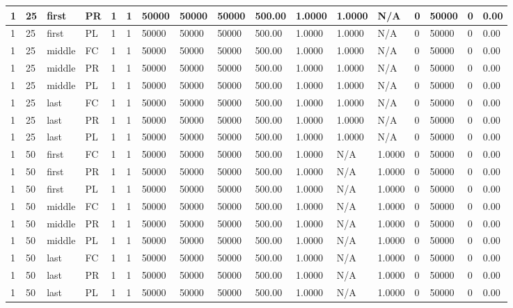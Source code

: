 \begin{tabular}{|l|l|l|l|l|l|l|l|l|l|l|l|l|l|l|l|l|}
1 & 25 & first & PR & 1 & 1 & 50000 & 50000 & 50000 & 500.00 & 1.0000 & 1.0000 & N/A & 0 & 50000 & 0 & 0.00 \\ \hline
1 & 25 & first & PL & 1 & 1 & 50000 & 50000 & 50000 & 500.00 & 1.0000 & 1.0000 & N/A & 0 & 50000 & 0 & 0.00 \\ \hline
1 & 25 & middle & FC & 1 & 1 & 50000 & 50000 & 50000 & 500.00 & 1.0000 & 1.0000 & N/A & 0 & 50000 & 0 & 0.00 \\ \hline
1 & 25 & middle & PR & 1 & 1 & 50000 & 50000 & 50000 & 500.00 & 1.0000 & 1.0000 & N/A & 0 & 50000 & 0 & 0.00 \\ \hline
1 & 25 & middle & PL & 1 & 1 & 50000 & 50000 & 50000 & 500.00 & 1.0000 & 1.0000 & N/A & 0 & 50000 & 0 & 0.00 \\ \hline
1 & 25 & last & FC & 1 & 1 & 50000 & 50000 & 50000 & 500.00 & 1.0000 & 1.0000 & N/A & 0 & 50000 & 0 & 0.00 \\ \hline
1 & 25 & last & PR & 1 & 1 & 50000 & 50000 & 50000 & 500.00 & 1.0000 & 1.0000 & N/A & 0 & 50000 & 0 & 0.00 \\ \hline
1 & 25 & last & PL & 1 & 1 & 50000 & 50000 & 50000 & 500.00 & 1.0000 & 1.0000 & N/A & 0 & 50000 & 0 & 0.00 \\ \hline
1 & 50 & first & FC & 1 & 1 & 50000 & 50000 & 50000 & 500.00 & 1.0000 & N/A & 1.0000 & 0 & 50000 & 0 & 0.00 \\ \hline
1 & 50 & first & PR & 1 & 1 & 50000 & 50000 & 50000 & 500.00 & 1.0000 & N/A & 1.0000 & 0 & 50000 & 0 & 0.00 \\ \hline
1 & 50 & first & PL & 1 & 1 & 50000 & 50000 & 50000 & 500.00 & 1.0000 & N/A & 1.0000 & 0 & 50000 & 0 & 0.00 \\ \hline
1 & 50 & middle & FC & 1 & 1 & 50000 & 50000 & 50000 & 500.00 & 1.0000 & N/A & 1.0000 & 0 & 50000 & 0 & 0.00 \\ \hline
1 & 50 & middle & PR & 1 & 1 & 50000 & 50000 & 50000 & 500.00 & 1.0000 & N/A & 1.0000 & 0 & 50000 & 0 & 0.00 \\ \hline
1 & 50 & middle & PL & 1 & 1 & 50000 & 50000 & 50000 & 500.00 & 1.0000 & N/A & 1.0000 & 0 & 50000 & 0 & 0.00 \\ \hline
1 & 50 & last & FC & 1 & 1 & 50000 & 50000 & 50000 & 500.00 & 1.0000 & N/A & 1.0000 & 0 & 50000 & 0 & 0.00 \\ \hline
1 & 50 & last & PR & 1 & 1 & 50000 & 50000 & 50000 & 500.00 & 1.0000 & N/A & 1.0000 & 0 & 50000 & 0 & 0.00 \\ \hline
1 & 50 & last & PL & 1 & 1 & 50000 & 50000 & 50000 & 500.00 & 1.0000 & N/A & 1.0000 & 0 & 50000 & 0 & 0.00 \\ \hline

\end{tabular}
